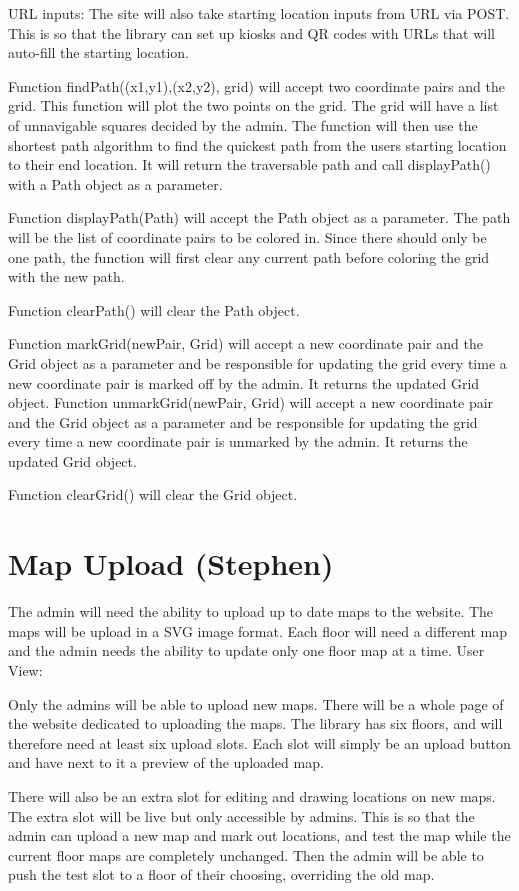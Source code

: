 \documentclass[letterpaper,10pt,titlepage, onecolumn, compsoc]{IEEEtran}
\begin{document}
URL inputs: The site will also take starting location inputs from URL via POST. This is so that the library can set up kiosks and QR codes with URLs that will auto-fill the starting location.
 
Function findPath((x1,y1),(x2,y2), grid) will accept two coordinate pairs and the grid. This function will plot the two points on the grid. The grid will have a list of unnavigable squares decided by the admin. The function will then use the shortest path algorithm to find the quickest path from the users starting location to their end location. It will return the traversable path and call displayPath() with a Path object as a parameter.  
 
Function displayPath(Path) will accept the Path object as a parameter. The path will be the list of coordinate pairs to be colored in. Since there should only be one path, the function will first clear any current path before coloring the grid with the new path.
 
Function clearPath() will clear the Path object.
 
Function markGrid(newPair, Grid) will accept a new coordinate pair and the Grid object as a parameter and be responsible for updating the grid every time a new coordinate pair is marked off by the admin. It returns the updated Grid object.
Function unmarkGrid(newPair, Grid) will accept a new coordinate pair and the Grid object as a parameter and be responsible for updating the grid every time a new coordinate pair is unmarked by the admin. It returns the updated Grid object.
 
Function clearGrid() will clear the Grid object.  

\section{Map Upload (Stephen)}
The admin will need the ability to upload up to date maps to the website. The maps will be upload in a SVG image format. Each floor will need a different map and the admin needs the ability to update only one floor map at a time.  
User View:

Only the admins will be able to upload new maps. There will be a whole page of the website dedicated to uploading the maps. The library has six floors, and will therefore need at least six upload slots. Each slot will simply be an upload button and have next to it a preview of the uploaded map.

There will also be an extra slot for editing and drawing locations on new maps. The extra slot will be live but only accessible by admins. This is so that the admin can upload a new map and mark out locations, and test the map while the current floor maps are completely unchanged. Then the admin will be able to push the test slot to a floor of their choosing, overriding the old map.  
\end{document}

